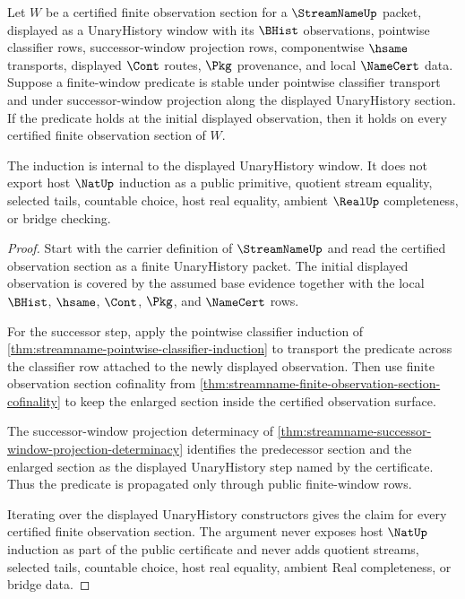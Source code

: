 \begin{theorem}
\label{thm:streamname-pointwise-window-induction}
Let $W$ be a certified finite observation section for a $\StreamNameUp$ packet, displayed as a UnaryHistory window with its $\BHist$ observations, pointwise classifier rows, successor-window projection rows, componentwise $\hsame$ transports, displayed $\Cont$ routes, $\Pkg$ provenance, and local $\NameCert$ data. Suppose a finite-window predicate is stable under pointwise classifier transport and under successor-window projection along the displayed UnaryHistory section. If the predicate holds at the initial displayed observation, then it holds on every certified finite observation section of $W$.

The induction is internal to the displayed UnaryHistory window. It does not export host $\NatUp$ induction as a public primitive, quotient stream equality, selected tails, countable choice, host real equality, ambient $\RealUp$ completeness, or bridge checking.
\end{theorem}
\begin{proof}
Start with the carrier definition of $\StreamNameUp$ and read the certified observation section as a finite UnaryHistory packet. The initial displayed observation is covered by the assumed base evidence together with the local $\BHist$, $\hsame$, $\Cont$, $\Pkg$, and $\NameCert$ rows.

For the successor step, apply the pointwise classifier induction of \autoref{thm:streamname-pointwise-classifier-induction} to transport the predicate across the classifier row attached to the newly displayed observation. Then use finite observation section cofinality from \autoref{thm:streamname-finite-observation-section-cofinality} to keep the enlarged section inside the certified observation surface.

The successor-window projection determinacy of \autoref{thm:streamname-successor-window-projection-determinacy} identifies the predecessor section and the enlarged section as the displayed UnaryHistory step named by the certificate. Thus the predicate is propagated only through public finite-window rows.

Iterating over the displayed UnaryHistory constructors gives the claim for every certified finite observation section. The argument never exposes host $\NatUp$ induction as part of the public certificate and never adds quotient streams, selected tails, countable choice, host real equality, ambient Real completeness, or bridge data.
\end{proof}

